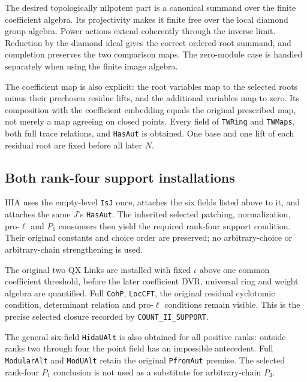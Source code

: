 The desired topologically nilpotent part is a canonical summand
over the finite coefficient algebra.  Its projectivity makes it
finite free over the local diamond group algebra.  Power actions
extend coherently through the inverse limit.  Reduction by the
diamond ideal gives the correct ordered-root summand, and
completion preserves the two comparison maps.  The zero-module
case is handled separately when using the finite image algebra.

The coefficient map is also explicit: the root variables map
to the selected roots minus their prechosen residue lifts, and
the additional variables map to zero.  Its composition with the
coefficient embedding equals the original prescribed map, not
merely a map agreeing on closed points.  Every field of
\texttt{TWRing} and \texttt{TWMaps}, both full trace relations,
and \texttt{Has\allowbreak Aut} is obtained.  One base and one lift of each
residual root are fixed before all later $N$.

\subsection{Both rank-four support installations}

HIA uses the empty-level \texttt{Is\allowbreak J} once, attaches the six
fields listed above to it, and attaches the same $J$'s
\texttt{Has\allowbreak Aut}.  The inherited selected patching, normalization,
pro-$\ell$ and $P_1$ consumers then yield the required rank-four
support condition.  Their original constants and choice order
are preserved; no arbitrary-choice or arbitrary-chain
strengthening is used.

The original two QX Links are installed with fixed $\iota$ above
one common coefficient threshold, before the later coefficient
DVR, universal ring and weight algebra are quantified.  Full
\texttt{Coh\allowbreak P}, \texttt{Loc\allowbreak CFT}, the original residual
cyclotomic condition, determinant relation and pro-$\ell$
conditions remain visible.  This is the precise selected closure
recorded by \texttt{COUNT\_\allowbreak II\_\allowbreak SUPPORT}.

The general six-field \texttt{Hida\allowbreak UAlt} is also obtained for
all positive ranks: outside ranks two through four the point
field has an impossible antecedent.  Full \texttt{Modular\allowbreak Alt}
and \texttt{Mod\allowbreak UAlt} retain the original \texttt{Pfrom\allowbreak Aut}
premise.  The selected rank-four $P_1$ conclusion is not used
as a substitute for arbitrary-chain $P_3$.


